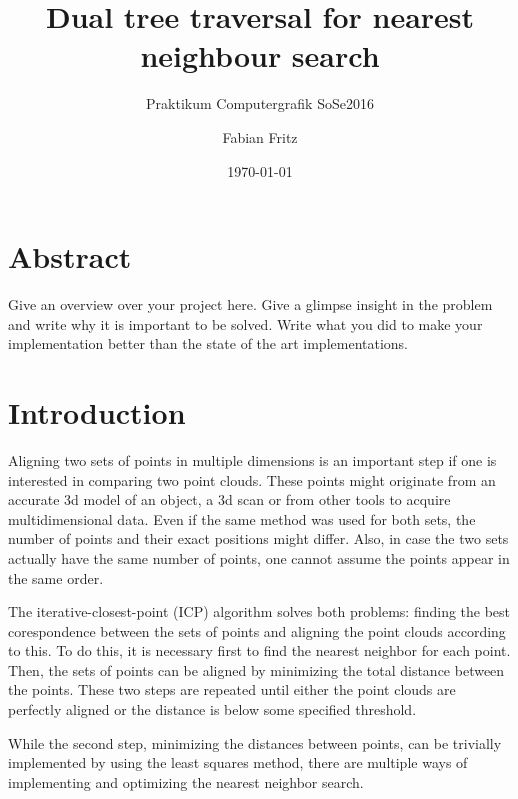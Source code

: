 \documentclass{utue} %
\title{Dual tree traversal for nearest neighbour search}
\author{Fabian Fritz}
\date{\today}
\subtitle{Praktikum Computergrafik SoSe2016}
\begin{document}

\maketitle

\section*{Abstract}

Give an overview over your project here. Give a glimpse insight in the problem and write why it is important to be solved. Write what you did to make your implementation better than the state of the art implementations.


\section{Introduction}

Aligning two sets of points in multiple dimensions is an important step if one is interested in comparing two point clouds. These points might originate from an accurate 3d model of an object, a 3d scan or from other tools to acquire multidimensional data. Even if the same method was used for both sets, the number of points and their exact positions might differ. Also, in case the two sets actually have the same number of points, one cannot assume the points appear in the same order.

The iterative-closest-point (ICP) algorithm solves both problems: finding the best corespondence between the sets of points and aligning the point clouds according to this. To do this, it is necessary first to find the nearest neighbor for each point. Then, the sets of points can be aligned by minimizing the total distance between the points. These two steps are repeated until either the point clouds are perfectly aligned or the distance is below some specified threshold.

While the second step, minimizing the distances between points, can be trivially implemented by using the least squares method, there are multiple ways of implementing and optimizing the nearest neighbor search.
\end{document}
